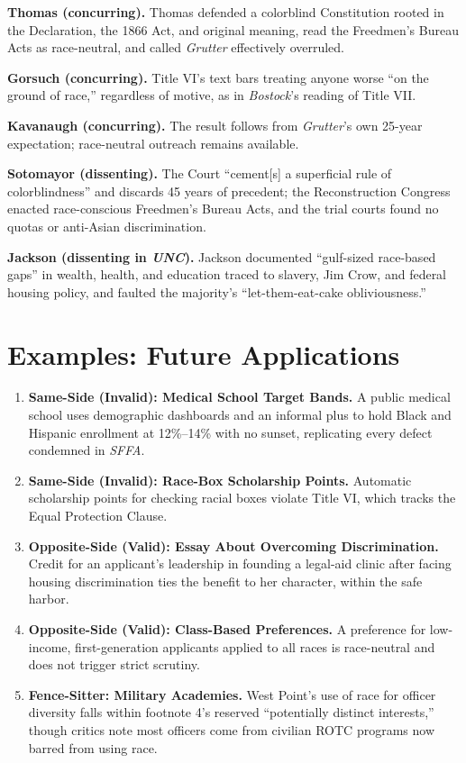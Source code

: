 \documentclass[12pt]{article}
\begin{document}
\textbf{Thomas (concurring).} Thomas defended a colorblind Constitution rooted in the Declaration, the 1866 Act, and original meaning, read the Freedmen's Bureau Acts as race-neutral, and called \textit{Grutter} effectively overruled.

\textbf{Gorsuch (concurring).} Title VI's text bars treating anyone worse ``on the ground of race,'' regardless of motive, as in \textit{Bostock}'s reading of Title VII.

\textbf{Kavanaugh (concurring).} The result follows from \textit{Grutter}'s own 25-year expectation; race-neutral outreach remains available.

\textbf{Sotomayor (dissenting).} The Court ``cement[s] a superficial rule of colorblindness'' and discards 45 years of precedent; the Reconstruction Congress enacted race-conscious Freedmen's Bureau Acts, and the trial courts found no quotas or anti-Asian discrimination.

\textbf{Jackson (dissenting in \textit{UNC}).} Jackson documented ``gulf-sized race-based gaps'' in wealth, health, and education traced to slavery, Jim Crow, and federal housing policy, and faulted the majority's ``let-them-eat-cake obliviousness.''

\section{Examples: Future Applications}

\begin{enumerate}
\item \textbf{Same-Side (Invalid): Medical School Target Bands.} A public medical school uses demographic dashboards and an informal plus to hold Black and Hispanic enrollment at 12\%--14\% with no sunset, replicating every defect condemned in \textit{SFFA}.
\item \textbf{Same-Side (Invalid): Race-Box Scholarship Points.} Automatic scholarship points for checking racial boxes violate Title VI, which tracks the Equal Protection Clause.
\item \textbf{Opposite-Side (Valid): Essay About Overcoming Discrimination.} Credit for an applicant's leadership in founding a legal-aid clinic after facing housing discrimination ties the benefit to her character, within the safe harbor.
\item \textbf{Opposite-Side (Valid): Class-Based Preferences.} A preference for low-income, first-generation applicants applied to all races is race-neutral and does not trigger strict scrutiny.
\item \textbf{Fence-Sitter: Military Academies.} West Point's use of race for officer diversity falls within footnote 4's reserved ``potentially distinct interests,'' though critics note most officers come from civilian ROTC programs now barred from using race.
\end{enumerate}
\end{document}
